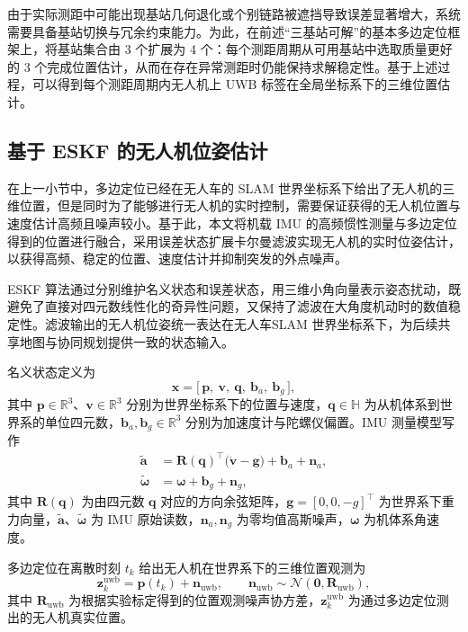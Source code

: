由于实际测距中可能出现基站几何退化或个别链路被遮挡导致误差显著增大，系统需要具备基站切换与冗余约束能力。为此，在前述“三基站可解”的基本多边定位框架上，将基站集合由 3 个扩展为 4 个：每个测距周期从可用基站中选取质量更好的 3 个完成位置估计，从而在存在异常测距时仍能保持求解稳定性。基于上述过程，可以得到每个测距周期内无人机上 UWB 标签在全局坐标系下的三维位置估计。

\subsection{基于 ESKF 的无人机位姿估计}
在上一小节中，多边定位已经在无人车的 SLAM 世界坐标系下给出了无人机的三维位置，但是同时为了能够进行无人机的实时控制，需要保证获得的无人机位置与速度估计高频且噪声较小。基于此，本文将机载 IMU 的高频惯性测量与多边定位得到的位置进行融合，采用误差状态扩展卡尔曼滤波实现无人机的实时位姿估计，以获得高频、稳定的位置、速度估计并抑制突发的外点噪声。

ESKF 算法\cite{eskf}通过分别维护名义状态和误差状态，用三维小角向量表示姿态扰动，既避免了直接对四元数线性化的奇异性问题，又保持了滤波在大角度机动时的数值稳定性。滤波输出的无人机位姿统一表达在无人车SLAM 世界坐标系下，为后续共享地图与协同规划提供一致的状态输入。

名义状态定义为
\begin{equation}
    \mathbf{x}
    =
    \bigl[\,
        \mathbf{p},\ 
        \mathbf{v},\ 
        \mathbf{q},\ 
        \mathbf{b}_a,\ 
        \mathbf{b}_g
    \,\bigr],
    \label{eq:eskf_state}
\end{equation}
其中 $\mathbf{p} \in \mathbb{R}^3$、$\mathbf{v} \in \mathbb{R}^3$ 分别为世界坐标系下的位置与速度，$\mathbf{q} \in \mathbb{H}$ 为从机体系到世界系的单位四元数，$\mathbf{b}_a,\mathbf{b}_g \in \mathbb{R}^3$ 分别为加速度计与陀螺仪偏置。IMU 测量模型写作
\begin{align}
    \tilde{\mathbf{a}} 
    &= \mathbf{R}(\mathbf{q})^\top\bigl(\dot{\mathbf{v}} - \mathbf{g}\bigr) + \mathbf{b}_a + \mathbf{n}_a, 
    \label{eq:imu_acc} \\
    \tilde{\boldsymbol\omega} 
    &= \boldsymbol\omega + \mathbf{b}_g + \mathbf{n}_g,
    \label{eq:imu_gyr}
\end{align}
其中 $\mathbf{R}(\mathbf{q})$ 为由四元数 $\mathbf{q}$ 对应的方向余弦矩阵，$\mathbf{g} = [0,0,-g]^\top$ 为世界系下重力向量，$\tilde{\mathbf{a}}$、$\tilde{\boldsymbol\omega}$ 为 IMU 原始读数，$\mathbf{n}_a,\mathbf{n}_g$ 为零均值高斯噪声，$\boldsymbol\omega$ 为机体系角速度。

多边定位在离散时刻 $t_k$ 给出无人机在世界系下的三维位置观测为
\begin{equation}
    \mathbf{z}_k^{\mathrm{uwb}}
    =
    \mathbf{p}(t_k) + \mathbf{n}_{\mathrm{uwb}}, 
    \qquad 
    \mathbf{n}_{\mathrm{uwb}} \sim \mathcal{N}(\mathbf{0},\mathbf{R}_{\mathrm{uwb}}),
    \label{eq:uwb_meas}
\end{equation}
其中 $\mathbf{R}_{\mathrm{uwb}}$ 为根据实验标定得到的位置观测噪声协方差，$\mathbf{z}_k^{\mathrm{uwb}}$ 为通过多边定位测出的无人机真实位置。

